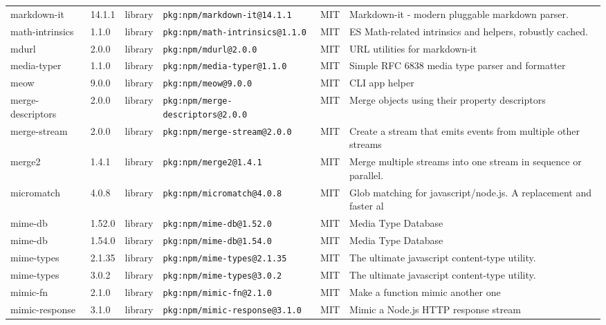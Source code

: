 \documentclass[11pt,a4paper]{article}
\begin{document}
\begin{longtable}{|p{4cm}|p{2cm}|p{1.6cm}|p{5cm}|p{1.5cm}|p{3.5cm}|}
\raggedright markdown-it & 14.1.1 & library & \small\texttt{pkg:npm/markdown-it@14.1.1} & MIT & \small Markdown-it - modern pluggable markdown parser. \\
\raggedright math-intrinsics & 1.1.0 & library & \small\texttt{pkg:npm/math-intrinsics@1.1.0} & MIT & \small ES Math-related intrinsics and helpers, robustly cached. \\
\raggedright mdurl & 2.0.0 & library & \small\texttt{pkg:npm/mdurl@2.0.0} & MIT & \small URL utilities for markdown-it \\
\raggedright media-typer & 1.1.0 & library & \small\texttt{pkg:npm/media-typer@1.1.0} & MIT & \small Simple RFC 6838 media type parser and formatter \\
\raggedright meow & 9.0.0 & library & \small\texttt{pkg:npm/meow@9.0.0} & MIT & \small CLI app helper \\
\raggedright merge-descriptors & 2.0.0 & library & \small\texttt{pkg:npm/merge-descriptors@2.0.0} & MIT & \small Merge objects using their property descriptors \\
\raggedright merge-stream & 2.0.0 & library & \small\texttt{pkg:npm/merge-stream@2.0.0} & MIT & \small Create a stream that emits events from multiple other streams \\
\raggedright merge2 & 1.4.1 & library & \small\texttt{pkg:npm/merge2@1.4.1} & MIT & \small Merge multiple streams into one stream in sequence or parallel. \\
\raggedright micromatch & 4.0.8 & library & \small\texttt{pkg:npm/micromatch@4.0.8} & MIT & \small Glob matching for javascript/node.js. A replacement and faster al \\
\raggedright mime-db & 1.52.0 & library & \small\texttt{pkg:npm/mime-db@1.52.0} & MIT & \small Media Type Database \\
\raggedright mime-db & 1.54.0 & library & \small\texttt{pkg:npm/mime-db@1.54.0} & MIT & \small Media Type Database \\
\raggedright mime-types & 2.1.35 & library & \small\texttt{pkg:npm/mime-types@2.1.35} & MIT & \small The ultimate javascript content-type utility. \\
\raggedright mime-types & 3.0.2 & library & \small\texttt{pkg:npm/mime-types@3.0.2} & MIT & \small The ultimate javascript content-type utility. \\
\raggedright mimic-fn & 2.1.0 & library & \small\texttt{pkg:npm/mimic-fn@2.1.0} & MIT & \small Make a function mimic another one \\
\raggedright mimic-response & 3.1.0 & library & \small\texttt{pkg:npm/mimic-response@3.1.0} & MIT & \small Mimic a Node.js HTTP response stream \\

\end{longtable}
\end{document}
